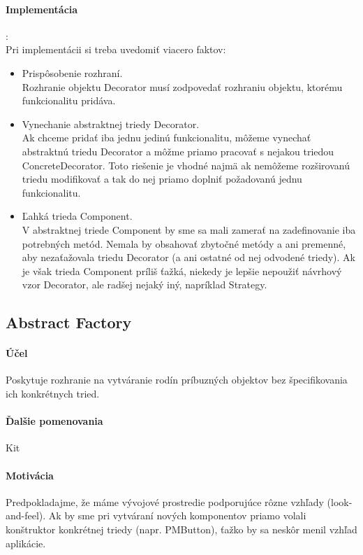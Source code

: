 			\paragraph{Implementácia}:\\
				Pri implementácii si treba uvedomiť viacero faktov:
				\begin{itemize}
					\item Prispôsobenie rozhraní.\\
					Rozhranie objektu Decorator musí zodpovedať rozhraniu objektu, ktorému funkcionalitu pridáva.
					\item Vynechanie abstraktnej triedy Decorator.\\
					Ak chceme pridať iba jednu jedinú funkcionalitu, môžeme vynechať abstraktnú triedu Decorator a môžme priamo pracovať s nejakou triedou ConcreteDecorator. Toto riešenie je vhodné najmä ak nemôžeme rozširovanú triedu modifikovať a tak do nej priamo doplniť požadovanú jednu funkcionalitu.

					\item Ľahká trieda Component.\\
					V abstraktnej triede Component by sme sa mali zamerať na zadefinovanie iba potrebných metód. Nemala by obsahovať zbytočné metódy a ani premenné, aby nezaťažovala triedu Decorator (a ani ostatné od nej odvodené triedy). Ak je však trieda Component príliš ťažká, niekedy je lepšie nepoužiť návrhový vzor Decorator, ale radšej nejaký iný, napríklad Strategy.
				\end{itemize}
	\subsection{Abstract Factory}
		\paragraph{Účel}
		Poskytuje rozhranie na vytváranie rodín príbuzných objektov bez špecifikovania ich konkrétnych tried.

		\paragraph{Ďalšie pomenovania}
		Kit

		\paragraph{Motivácia}
		Predpokladajme, že máme vývojové prostredie podporujúce rôzne vzhľady (look-and-feel). Ak by sme pri vytváraní nových komponentov priamo volali konštruktor konkrétnej triedy (napr. PMButton), ťažko by sa neskôr menil vzhľad aplikácie.

